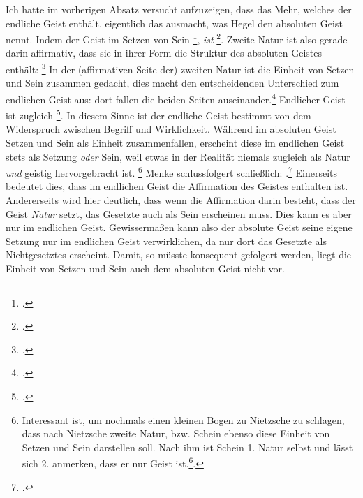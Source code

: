 \documentclass[12pt, a4paper, openany]{report}
\begin{document}
Ich hatte im vorherigen Absatz versucht aufzuzeigen, dass das Mehr, welches der endliche Geist enthält, eigentlich das ausmacht, was Hegel den absoluten Geist nennt.
Indem der Geist im Setzen von Sein \footcite[][§ 384, S. 29]{hegel_enzyklopädie_1969}, \emph{ist} \footcite[][144]{menke_autonomie_2018}.
Zweite Natur ist also gerade darin affirmativ, dass sie in ihrer Form die Struktur des absoluten Geistes enthält: 
\footcite[][§ 385 Z, S. 34]{hegel_enzyklopädie_1969}
In der (affirmativen Seite der) zweiten Natur ist die Einheit von Setzen und Sein zusammen gedacht, dies macht den entscheidenden Unterschied zum endlichen Geist aus: 
dort fallen die beiden Seiten auseinander.\footcite[Vgl.][S. 143 - S. 144]{menke_autonomie_2018}
Endlicher Geist ist zugleich \footcite[][144]{menke_autonomie_2018}.
In diesem Sinne ist der endliche Geist bestimmt von dem Widerspruch zwischen Begriff und Wirklichkeit. 
Während im absoluten Geist Setzen und Sein als Einheit zusammenfallen, erscheint diese im endlichen Geist stets als Setzung \emph{oder} Sein, weil etwas in der Realität niemals zugleich als Natur \emph{und} geistig hervorgebracht ist.%
\footnote{
    Interessant ist, um nochmals einen kleinen Bogen zu Nietzsche zu schlagen, dass nach Nietzsche zweite Natur, bzw. Schein ebenso diese Einheit von Setzen und Sein darstellen soll.
    Nach ihm ist Schein 1. Natur selbst und lässt sich 2. anmerken, dass er nur Geist ist.\footcite[Vgl.][S. 417]{nietzsche_morgenrote_1999}. 
}
Menke schlussfolgert schließlich: 
.\footcite[][144]{menke_autonomie_2018}
Einerseits bedeutet dies, dass im endlichen Geist die Affirmation des Geistes enthalten ist.
Andererseits wird hier deutlich, dass wenn die Affirmation darin besteht, dass der Geist \emph{Natur} setzt, das Gesetzte auch als Sein erscheinen muss.
Dies kann es aber nur im endlichen Geist.
Gewissermaßen kann also der absolute Geist seine eigene Setzung nur im endlichen Geist verwirklichen, da nur dort das Gesetzte als Nichtgesetztes erscheint.
Damit, so müsste konsequent gefolgert werden, liegt die Einheit von Setzen und Sein auch dem absoluten Geist nicht vor. 
\end{document}

